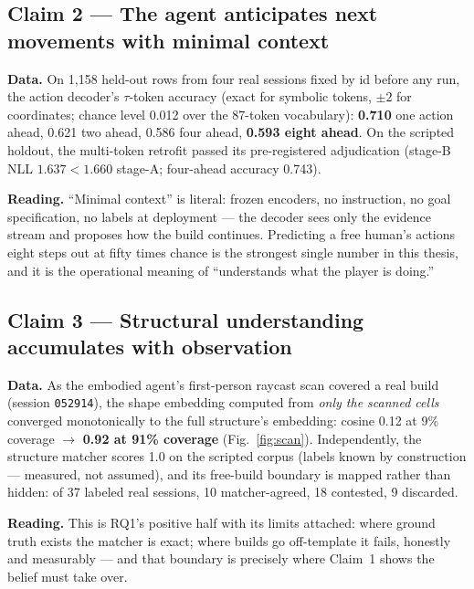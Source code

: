 \documentclass[11pt]{article}
\begin{document}
\subsection{Claim 2 --- The agent anticipates next movements with minimal context}
\label{sec:claim2}

\textbf{Data.} On 1{,}158 held-out rows from four real sessions fixed by id
before any run, the action decoder's $\tau$-token accuracy (exact for symbolic
tokens, $\pm2$ for coordinates; chance level 0.012 over the 87-token
vocabulary): \textbf{0.710} one action ahead, 0.621 two ahead, 0.586 four
ahead, \textbf{0.593 eight ahead}. On the scripted holdout, the multi-token
retrofit passed its pre-registered adjudication (stage-B NLL $1.637 < 1.660$
stage-A; four-ahead accuracy 0.743).

\textbf{Reading.} ``Minimal context'' is literal: frozen encoders, no
instruction, no goal specification, no labels at deployment --- the decoder
sees only the evidence stream and proposes how the build continues. Predicting
a free human's actions eight steps out at fifty times chance is the strongest
single number in this thesis, and it is the operational meaning of
``understands what the player is doing.''

\subsection{Claim 3 --- Structural understanding accumulates with observation}
\label{sec:claim3}

\textbf{Data.} As the embodied agent's first-person raycast scan covered a real
build (session \texttt{052914}), the shape embedding computed from \emph{only
the scanned cells} converged monotonically to the full structure's embedding:
cosine 0.12 at 9\% coverage $\to$ \textbf{0.92 at 91\% coverage}
(Fig.~\ref{fig:scan}). Independently, the structure matcher scores 1.0 on the
scripted corpus (labels known by construction --- measured, not assumed), and
its free-build boundary is mapped rather than hidden: of 37 labeled real
sessions, 10 matcher-agreed, 18 contested, 9 discarded.

\textbf{Reading.} This is RQ1's positive half with its limits attached: where
ground truth exists the matcher is exact; where builds go off-template it
fails, honestly and measurably --- and that boundary is precisely where
Claim~1 shows the belief must take over.
\end{document}
